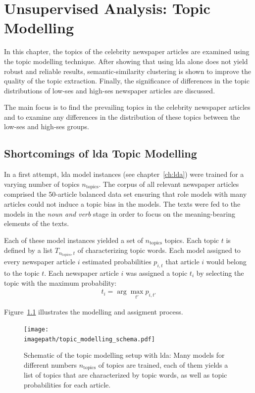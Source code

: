 \renewcommand{\imagepath}{../50-unsupervised/img}
\newcommand{\ntopics}{n_\text{topics}}
\newcommand{\nclusters}{n_\text{clusters}}

\chapter{Unsupervised Analysis: Topic Modelling}
In this chapter, the topics of the celebrity newspaper articles are examined using the topic modelling technique. After showing that using \gls{lda} alone does not yield robust and reliable results, semantic-similarity clustering is shown to improve the quality of the topic extraction.  Finally, the significance of differences in the topic distributions of low-\gls{ses} and high-\gls{ses} newspaper articles are discussed.

The main focus is to find the prevailing topics in the celebrity newspaper articles and to examine any differences in the distribution of these topics between the low-\gls{ses} and high-\gls{ses} groups.

\section{Shortcomings of \gls{lda} Topic Modelling}
In a first attempt, \gls{lda} model instances (see chapter~\ref{ch:lda}) were trained for a varying number of topics $\ntopics$. The corpus of all relevant newspaper articles comprised the 50-article balanced data set ensuring that role models with many articles could not induce a topic bias in the models. The texts were fed to the models in the \textit{noun and verb} stage in order to focus on the meaning-bearing elements of the texts.

Each of these model instances yielded a set of $\ntopics$ topics. Each topic $t$ is defined by a list $T_{\ntopics, t}$ of characterizing topic words. Each model assigned to every newspaper article $i$ estimated probabilities $p_{i, t}$ that article $i$ would belong to the topic $t$. Each newspaper article $i$ was assigned a topic $t_i$ by selecting the topic with the maximum probability:
\begin{align}
    t_i = \arg \max_{t'} p_{i, t'}
\end{align}

Figure~\ref{fig:topic_modelling_schema} illustrates the modelling and assigment process.
\begin{figure}
    \centering
    \texttt{[image: \\imagepath/topic\_modelling\_schema.pdf]}
    \caption{Schematic of the topic modelling setup with \gls{lda}: Many models for different numbers $\ntopics$ of topics are trained, each of them yields a list of topics that are characterized by topic words, as well as topic probabilities for each article.}\label{fig:topic_modelling_schema}
\end{figure}

